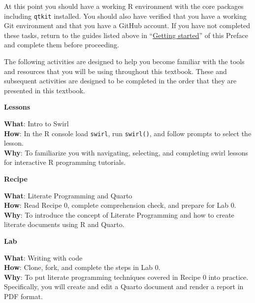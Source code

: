 \documentclass[
  letterpaper,
]{latex/krantz}
\theoremstyle{definition}
\theoremstyle{remark}
\begin{document}

At this point you should have a working R environment with the core
packages including \texttt{qtkit} installed. You should also have
verified that you have a working Git environment and that you have a
GitHub account. If you have not completed these tasks, return to the
guides listed above in ``\hyperref[sec-p-getting-started]{Getting
started}'' of this Preface and complete them before proceeding.

The following activities are designed to help you become familiar with
the tools and resources that you will be using throughout this textbook.
These and subsequent activities are designed to be completed in the
order that they are presented in this textbook.

\begin{tcolorbox}[enhanced jigsaw, breakable, leftrule=.75mm, arc=.35mm, colframe=quarto-callout-color-frame, colback=white, left=2mm, bottomrule=.15mm, rightrule=.15mm, toprule=.15mm, opacityback=0]

\textbf{ Lessons}

\textbf{What}: Intro to Swirl\\
\textbf{How}: In the R console load \texttt{swirl}, run
\texttt{swirl()}, and follow prompts to select the lesson.\\
\textbf{Why}: To familiarize you with navigating, selecting, and
completing swirl lessons for interactive R programming tutorials.

\end{tcolorbox}

\begin{tcolorbox}[enhanced jigsaw, breakable, leftrule=.75mm, arc=.35mm, colframe=quarto-callout-color-frame, colback=white, left=2mm, bottomrule=.15mm, rightrule=.15mm, toprule=.15mm, opacityback=0]

\textbf{ Recipe}

\textbf{What}: Literate Programming and Quarto\\
\textbf{How}: Read Recipe 0, complete comprehension check, and prepare
for Lab 0.\\
\textbf{Why}: To introduce the concept of Literate Programming and how
to create literate documents using R and Quarto.

\end{tcolorbox}

\begin{tcolorbox}[enhanced jigsaw, breakable, leftrule=.75mm, arc=.35mm, colframe=quarto-callout-color-frame, colback=white, left=2mm, bottomrule=.15mm, rightrule=.15mm, toprule=.15mm, opacityback=0]

\textbf{ Lab}

\textbf{What}: Writing with code\\
\textbf{How}: Clone, fork, and complete the steps in Lab 0.\\
\textbf{Why}: To put literate programming techniques covered in Recipe 0
into practice. Specifically, you will create and edit a Quarto document
and render a report in PDF format.

\end{tcolorbox}
\end{document}
